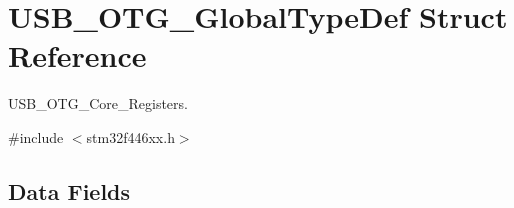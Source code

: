 \hypertarget{struct_u_s_b___o_t_g___global_type_def}{}\section{U\+S\+B\+\_\+\+O\+T\+G\+\_\+\+Global\+Type\+Def Struct Reference}
\label{struct_u_s_b___o_t_g___global_type_def}


U\+S\+B\+\_\+\+O\+T\+G\+\_\+\+Core\+\_\+\+Registers.  




{\ttfamily \#include $<$stm32f446xx.\+h$>$}

\subsection*{Data Fields}
